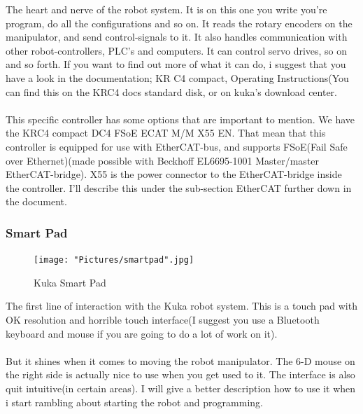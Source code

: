 \documentclass{article}
\begin{document}
        The heart and nerve of the robot system. It is on this one you write you're program, do all the configurations and so on. It reads the rotary encoders on the manipulator, and send control-signals to it. It also handles communication with other robot-controllers, PLC's and computers. It can control servo drives, so on and so forth. If you want to find out more of what it can do, i suggest that you have a look in the documentation; KR C4 compact, Operating Instructions(You can find this on the KRC4 docs standard disk, or on kuka's download center.
        \\\\
        This specific controller has some options that are important to mention. We have the KRC4 compact DC4 FSoE ECAT M/M X55 EN. That mean that this controller is equipped for use with EtherCAT-bus, and supports FSoE(Fail Safe over Ethernet)(made possible with Beckhoff EL6695-1001 Master/master EtherCAT-bridge).  X55 is the power connector to the EtherCAT-bridge inside the controller. I'll describe this under the sub-section EtherCAT further down in the document.
        
\newpage

        \subsubsection{Smart Pad}
        
        \begin{figure}[!h]
            \centering
            \texttt{[image: "Pictures/smartpad".jpg]}
            \caption{Kuka Smart Pad}
        \end{figure}
        
        The first line of interaction with the Kuka robot system. This is a touch pad with OK resolution and horrible touch interface(I suggest you use a Bluetooth keyboard and mouse if you are going to do a lot of work on it).
        \\\\
        But it shines when it comes to moving the robot manipulator. The 6-D mouse on the right side is actually nice to use when you get used to it. The interface is also quit intuitive(in certain areas). I will give a better description how to use it when i start rambling about starting the robot and programming.
        
        \newpage
        
\end{document}
